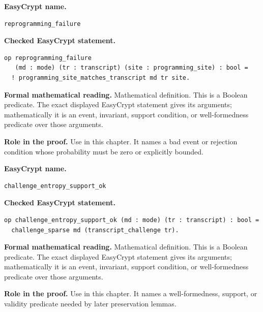 \begin{formaldefinition}
\noindent\textbf{EasyCrypt name.}
\begin{lstlisting}[language=EasyCrypt,basicstyle=\ttfamily\scriptsize]
reprogramming_failure
\end{lstlisting}
\noindent\textbf{Checked EasyCrypt statement.}
\begin{lstlisting}[language=EasyCrypt,basicstyle=\ttfamily\scriptsize]
op reprogramming_failure
   (md : mode) (tr : transcript) (site : programming_site) : bool =
  ! programming_site_matches_transcript md tr site.
\end{lstlisting}
\noindent\textbf{Formal mathematical reading.}
Mathematical definition. This is a Boolean predicate.  The exact displayed EasyCrypt statement gives its arguments; mathematically it is an event, invariant, support condition, or well-formedness predicate over those arguments.

\noindent\textbf{Role in the proof.}
Use in this chapter. It names a bad event or rejection condition whose probability must be zero or explicitly bounded.

\end{formaldefinition}

\begin{formaldefinition}
\noindent\textbf{EasyCrypt name.}
\begin{lstlisting}[language=EasyCrypt,basicstyle=\ttfamily\scriptsize]
challenge_entropy_support_ok
\end{lstlisting}
\noindent\textbf{Checked EasyCrypt statement.}
\begin{lstlisting}[language=EasyCrypt,basicstyle=\ttfamily\scriptsize]
op challenge_entropy_support_ok (md : mode) (tr : transcript) : bool =
  challenge_sparse md (transcript_challenge tr).
\end{lstlisting}
\noindent\textbf{Formal mathematical reading.}
Mathematical definition. This is a Boolean predicate.  The exact displayed EasyCrypt statement gives its arguments; mathematically it is an event, invariant, support condition, or well-formedness predicate over those arguments.

\noindent\textbf{Role in the proof.}
Use in this chapter. It names a well-formedness, support, or validity predicate needed by later preservation lemmas.

\end{formaldefinition}

